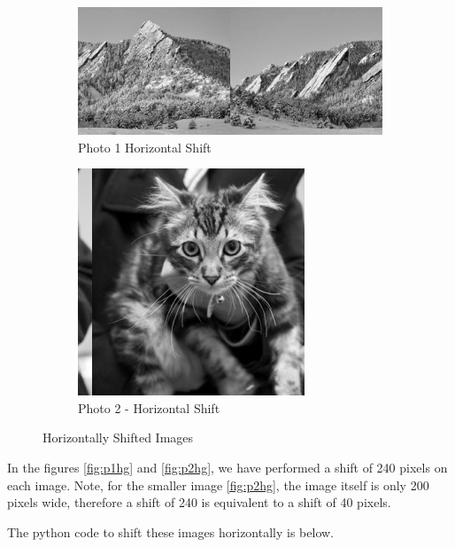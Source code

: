     \begin{figure}[ht]
      \centering
      \begin{subfigure}{0.6\textwidth}
        \centering
        \includegraphics[scale=0.5]{./img/hsg1.png}
        \caption{Photo 1 Horizontal Shift}
        \label{fig:p1hg}
      \end{subfigure}
      \begin{subfigure}{0.3\textwidth}
        \centering
        \includegraphics[scale=0.5]{./img/hsg2.png}
        \caption{Photo 2 - Horizontal Shift}
        \label{fig:p2hg}
      \end{subfigure}
      \caption{Horizontally Shifted Images}
      \label{fig:hs_images}
    \end{figure}

In the figures \eqref{fig:p1hg} and \eqref{fig:p2hg}, we have performed a shift of 240 pixels on each image. Note, for the smaller image \eqref{fig:p2hg}, the image itself is only 200 pixels wide, therefore a shift of 240 is equivalent to a shift of 40 pixels.

The python code to shift these images horizontally is below.

    
